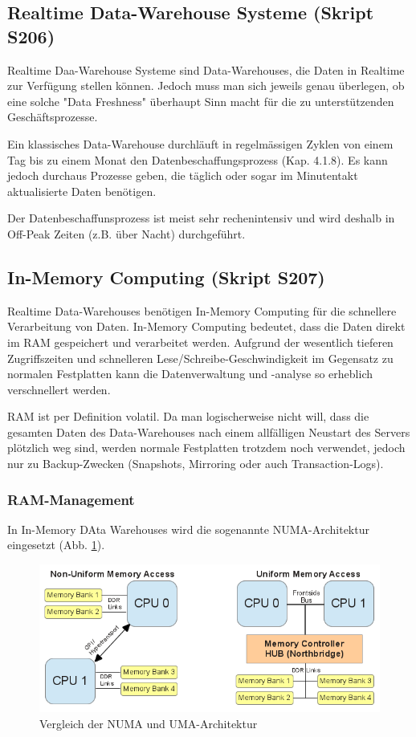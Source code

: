 \documentclass[a4paper, 11pt, nofootinbib]{article}
\begin{document}
\subsection{Realtime Data-Warehouse Systeme (Skript S206)}
Realtime Daa-Warehouse Systeme sind Data-Warehouses, die Daten in Realtime zur Verfügung stellen können. Jedoch muss man sich jeweils genau überlegen, ob eine solche "Data Freshness" überhaupt Sinn macht für die zu unterstützenden Geschäftsprozesse.

Ein klassisches Data-Warehouse durchläuft in regelmässigen Zyklen von einem Tag bis zu einem Monat den Datenbeschaffungsprozess (Kap. 4.1.8). Es kann jedoch durchaus Prozesse geben, die täglich oder sogar im Minutentakt aktualisierte Daten benötigen. 

Der Datenbeschaffunsprozess ist meist sehr rechenintensiv und wird deshalb in Off-Peak Zeiten (z.B. über Nacht) durchgeführt.

\subsection{In-Memory Computing (Skript S207)}
Realtime Data-Warehouses benötigen In-Memory Computing für die schnellere Verarbeitung von Daten. In-Memory Computing bedeutet, dass die Daten direkt im RAM gespeichert und verarbeitet werden. Aufgrund der wesentlich tieferen Zugriffszeiten und schnelleren Lese/Schreibe-Geschwindigkeit im Gegensatz zu normalen Festplatten kann die Datenverwaltung und -analyse so erheblich verschnellert werden.

RAM ist per Definition volatil. Da man logischerweise nicht will, dass die gesamten Daten des Data-Warehouses nach einem allfälligen Neustart des Servers plötzlich weg sind, werden normale Festplatten trotzdem noch verwendet, jedoch nur zu Backup-Zwecken (Snapshots, Mirroring oder auch Transaction-Logs).

\subsubsection{RAM-Management}
In In-Memory DAta Warehouses wird die sogenannte NUMA-Architektur eingesetzt (Abb. \ref{fig:numa}).

\begin{figure}[htb]
	\centering
	\includegraphics[keepaspectratio=true,height=10\baselineskip]{numa.png}
	\caption{Vergleich der NUMA und UMA-Architektur}
	\label{fig:numa}
\end{figure}
\end{document}
